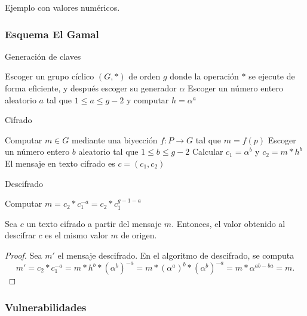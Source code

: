 \begin{example}
	Ejemplo con valores numéricos.
\end{example}

\subsubsection{Esquema El Gamal}

\begin{algorithm}
	\caption{Generación de claves}\label{alg:1}
	Escoger un grupo cíclico $(G, *)$ de orden $g$ donde la operación $*$ se ejecute de forma eficiente, y después escoger su generador $\alpha$\;
	Escoger un número entero aleatorio $a$ tal que $1 \leq a \leq g - 2$ y computar $h = \alpha^a$\;
\end{algorithm}

\begin{algorithm}
	\caption{Cifrado}\label{alg:2}
	Computar $m \in G$ mediante una biyección $f : P \rightarrow G$ tal que $m = f(p)$\;
	Escoger un número entero $b$ aleatorio tal que $1 \leq b \leq g - 2$\;
	Calcular $c_1 = \alpha^b$ y $c_2 = m*h^b$\;
	El mensaje en texto cifrado es $c = (c_1, c_2)$\;
\end{algorithm}

\begin{algorithm}
	\caption{Descifrado}\label{alg:3}
	Computar $m = c_2 * c_1^{-a} = c_2 * c_1^{g - 1 - a}$\;
\end{algorithm}

\newpage

\begin{theorem}
	Sea $c$ un texto cifrado a partir del mensaje $m$. Entonces, el valor obtenido al descifrar $c$ es el mismo valor $m$ de origen.
\end{theorem}

\begin{proof}
	Sea $m'$ el mensaje descifrado. En el algoritmo de descifrado, se computa
	\[m' = c_2*c_1^{-a} = m*h^b*(\alpha^b)^{-a} = m*(\alpha^a)^b*(\alpha^b)^{-a} = m*\alpha^{ab-ba} = m.\]
\end{proof}

\subsubsection{Vulnerabilidades}

